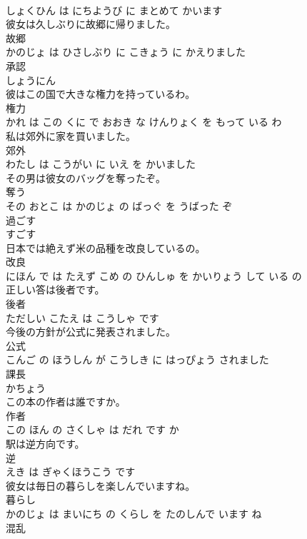 \documentclass[8pt]{extreport}
\begin{document}
\begin{CJK}{UTF8}{min}
\\	しょくひん は にちようび に まとめて かいます		
\\	彼女は久しぶりに故郷に帰りました。	
\\	故郷 
\\	かのじょ は ひさしぶり に こきょう に かえりました		
\\	承認	
\\	しょうにん		
\\	彼はこの国で大きな権力を持っているわ。	
\\	権力 
\\	かれ は この くに で おおき な けんりょく を もって いる わ		
\\	私は郊外に家を買いました。	
\\	郊外 
\\	わたし は こうがい に いえ を かいました		
\\	その男は彼女のバッグを奪ったぞ。	
\\	奪う 
\\	その おとこ は かのじょ の ばっぐ を うばった ぞ		
\\	過ごす	
\\	すごす		
\\	日本では絶えず米の品種を改良しているの。	
\\	改良 
\\	にほん で は たえず こめ の ひんしゅ を かいりょう して いる の		
\\	正しい答は後者です。	
\\	後者 
\\	ただしい こたえ は こうしゃ です		
\\	今後の方針が公式に発表されました。	
\\	公式 
\\	こんご の ほうしん が こうしき に はっぴょう されました		
\\	課長	
\\	かちょう		
\\	この本の作者は誰ですか。	
\\	作者 
\\	この ほん の さくしゃ は だれ です か		
\\	駅は逆方向です。	
\\	逆 
\\	えき は ぎゃくほうこう です		
\\	彼女は毎日の暮らしを楽しんでいますね。	
\\	暮らし 
\\	かのじょ は まいにち の くらし を たのしんで います ね		
\\	混乱	

\end{CJK}
\end{document}
